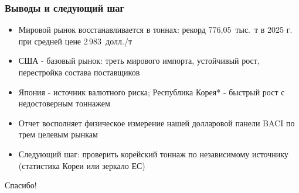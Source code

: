 \documentclass{beamer}
\begin{document}
\begin{frame}[t]
  \frametitle{Выводы и следующий шаг}
  \begin{itemize}
    \item Мировой рынок восстанавливается в тоннах: рекорд 776,05~тыс.~т в 2025 г. при средней цене 2\,983~долл./т
    \item США - базовый рынок: треть мирового импорта, устойчивый рост, перестройка состава поставщиков
    \item Япония - источник валютного риска; Республика Корея* - быстрый рост с недостоверным тоннажем
    \item Отчет восполняет физическое измерение нашей долларовой панели BACI по трем целевым рынкам
    \item Следующий шаг: проверить корейский тоннаж по независимому источнику (статистика Кореи или зеркало ЕС)
  \end{itemize}
\end{frame}

\begin{frame}[c]
  \centering
  {\fontsize{24}{28}\selectfont Спасибо!}
\end{frame}
\end{document}

